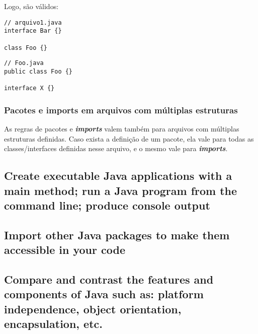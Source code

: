 \documentclass[12pt]{article}
\begin{document}
Logo, são válidos:

\begin{lstlisting}
// arquivo1.java
interface Bar {}

class Foo {}
\end{lstlisting}


\begin{lstlisting}
// Foo.java
public class Foo {}

interface X {}
\end{lstlisting}

\subsubsection{Pacotes e imports em arquivos com múltiplas estruturas}

As regras de pacotes e \textbf{\textit{imports}} valem também para arquivos com múltiplas estruturas definidas. Caso exista a definição de um pacote, ela vale para todas as classes/interfaces definidas nesse arquivo, e o mesmo vale para \textbf{\textit{imports}}.

\subsection*{Create executable Java applications with a main method; run a Java program from the command line; produce console output}





\newpage

\subsection*{Import other Java packages to make them accessible in your code}
\subsection*{Compare and contrast the features and components of Java such as: platform independence, object orientation, encapsulation, etc.}

	
\end{document}
